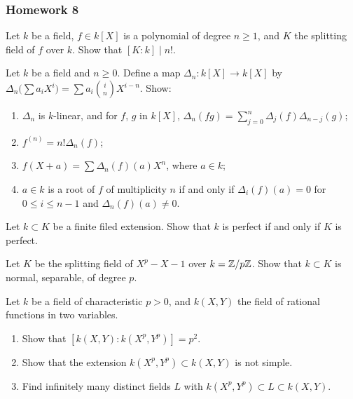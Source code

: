 \subsubsection{Homework 8}
\begin{problem}
  Let $k$ be a field, $f\in k[X]$ is a polynomial of degree $n\geq 1$,
  and $K$ the splitting field of $f$ over $k$. Show that
  $[K:k]\mid n!$.
\end{problem}
\begin{solution}
\end{solution}

\begin{problem}
  Let $k$ be a field and $n\geq 0$. Define a map
  $\Delta_n\colon k[X]\to k[X]$ by
  $\Delta_n\bigl(\sum a_iX^i\bigr)=\sum
  a_i\binom{i}{n}X^{i-n}$. Show:
\begin{enumerate}[label=(\alph*),noitemsep]
\item $\Delta_n$ is $k$-linear, and for $f$, $g$ in $k[X]$,
  $\Delta_n(fg)=\sum_{j=0}^n\Delta_j(f)\Delta_{n-j}(g)$;
\item $f^{(n)}=n!\Delta_n(f)$;
\item $f(X+a)=\sum\Delta_n(f)(a)X^n$, where $a\in k$;
\item $a\in k$ is a root of $f$ of multiplicity $n$ if and only if
  $\Delta_i(f)(a)=0$ for $0\leq i\leq n-1$ and $\Delta_n(f)(a)\neq 0$.
\end{enumerate}
\end{problem}
\begin{solution}
\end{solution}

\begin{problem}
  Let $k\subset K$ be a finite filed extension. Show that $k$ is
  perfect if and only if $K$ is perfect.
\end{problem}
\begin{solution}
\end{solution}

\begin{problem}
  Let $K$ be the splitting field of $X^p-X-1$ over
  $k=\mathbb{Z}/p\mathbb{Z}$. Show that $k\subset K$ is normal,
  separable, of degree $p$.
\end{problem}
\begin{solution}
\end{solution}

\begin{problem}
  Let $k$ be a field of characteristic $p>0$, and $k(X,Y)$ the field
  of rational functions in two variables.
\begin{enumerate}[label=(\alph*),noitemsep]
\item Show that $\left[k(X,Y):k(X^p,Y^p)\right]=p^2$.
\item Show that the extension $k(X^p,Y^p)\subset k(X,Y)$ is not
  simple.
\item Find infinitely many distinct fields $L$ with
  $k(X^p,Y^p)\subset L\subset k(X,Y)$.
\end{enumerate}
\end{problem}
\begin{solution}
\end{solution}

